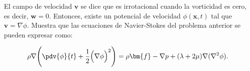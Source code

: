\documentclass[../main.tex]{subfiles}
\begin{document}
\begin{problema}
	El campo de velocidad \(\bm{v}\) se dice que es irrotacional cuando
	la vorticidad es cero, es decir, \(\bm{w} = 0\). Entonces,
	existe un potencial de velocidad \(\phi(\bm{x}, t)\) tal que
	\(\bm{v} = \nabla{\phi}\). Muestra que las ecuaciones de
	Navier-Stokes del problema anterior se pueden expresar como:

	\begin{equation*}
		\rho \nabla{\Biggl(\pdv{\phi}{t} + \dfrac{1}{2}\Bigl(\nabla{\phi}\Bigr)^{2}\Biggr)} =
		\rho \bm{f} - \nabla{p} + (\lambda + 2\mu)\nabla{(\nabla^{2}{\phi})}.
	\end{equation*}
\end{problema}
\end{document}
